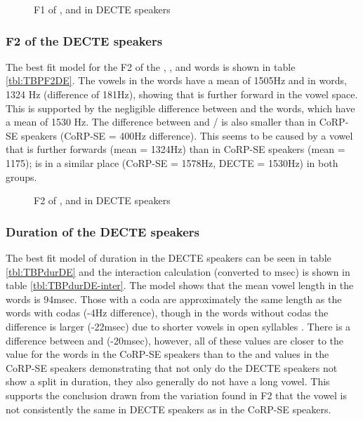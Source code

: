 \documentclass[../../00.FullDoc/tex/Thesis]{subfiles}
\begin{document}
\begin{figure}[h]
	
	\caption{F1 of \trap{}, \bath{} and \palm{}  in DECTE speakers} \label{fig:TBF1DE}
\end{figure}

\subsubsection{F2 of the DECTE speakers}
The best fit model for the F2 of the \trap{}, \bath{}, and \palm{} words is shown in table \ref{tbl:TBPF2DE}. The vowels in the \bath{} words have a mean of 1505Hz and  in \palm{} words, 1324 Hz (difference of 181Hz), showing that \bath{} is further forward in the vowel space. This is supported by the negligible difference between \bath{} and the \trap{} words, which have a mean of 1530 Hz. The difference between \palm{} and \trap{}/\bath{} is also smaller than in CoRP-SE speakers (CoRP-SE = 400Hz difference). This seems to be caused by a \palm{} vowel that is further forwards (mean = 1324Hz) than in CoRP-SE speakers (mean = 1175); \trap{} is in a similar place (CoRP-SE = 1578Hz, DECTE = 1530Hz) in both groups. 



\begin{figure}[h]
	
	\caption{F2 of \trap{}, \bath{} and \palm{}  in DECTE speakers} \label{fig:TBF2DE}
\end{figure}


\subsubsection{Duration of the DECTE speakers}

The best fit model of duration in the DECTE speakers can be seen in table \ref{tbl:TBPdurDE} and the interaction calculation (converted to msec) is shown in table \ref{tbl:TBPdurDE-inter}. The model shows that the mean vowel length in the \bath{} words is 94msec. Those with a coda are approximately the same length as the \trap{} words with codas (-4Hz difference), though in the words without codas the difference is larger (-22msec) due to shorter \trap{} vowels in open syllables . There is a difference between \trap{} and \palm{} (-20msec), however, all of these values are closer to the value for the \trap{} words in the CoRP-SE speakers than to the \palm{} and \bath{} values in the CoRP-SE speakers demonstrating that not only do the DECTE speakers not show a \TB{} split in duration, they also generally do not have a long \palm{} vowel. This supports the conclusion drawn from the variation found in F2 that the \palm{} vowel is not consistently the same in DECTE speakers as in the CoRP-SE speakers.
\end{document}
